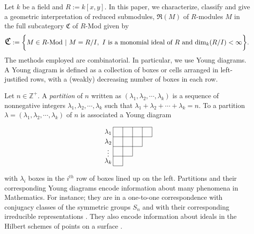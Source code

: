 \documentclass[12pt,a4paper]{article}
\newcommand{\noi}{\noindent}
\begin{document}
		\begin{paragraph}\noi
			Let $k$ be a field and $R:=k[x, y]$. In this paper, we characterize, classify and give a geometric interpretation of reduced submodules, $\mathfrak{R}(M)$ of $R$-modules $M$ in the full subcategory $\mathfrak{C}$ of $R$-Mod given by $$\text{\Large $\mathfrak{C}$}:=\bigg\{ M \in R\text{-Mod} ~|~ M=R/I,~ I~\text{is a monomial ideal of $R$ and} ~\text{dim}_k  (R/I)  < \infty\bigg\}.$$
			The methods employed are combinatorial. In particular, we use Young diagrams. A Young diagram is defined as a collection of boxes or cells arranged in left-justified rows, with a (weakly) decreasing number of boxes in each row. 
		\end{paragraph}
		\begin{paragraph}\noi
			Let $n\in \mathbb{Z}^+$. A {\it partition} of $n$ written as $(\lambda_1, \lambda_2, \cdots, \lambda_k)$ is a sequence of nonnegative integers $\lambda_1, \lambda_2,\cdots,\lambda_k$ such that $\lambda_1+ \lambda_2+\cdots+\lambda_k=n$. To a partition $\lambda=(\lambda_1, \lambda_2, \cdots, \lambda_k)$ of $n$ is associated a Young diagram
			
			$$	\begin{tikzpicture}[scale=0.5]
				\draw [-] (0, 0) -- (1, 0);
				\draw [-] (0, 0) -- (0, 4);
				\draw [-] (1, 0) -- (1, 4);
				\draw [-] (2, 1) -- (2, 4);
				\draw [-] (3, 2) -- (3, 4);
				\draw [-] (4, 3) -- (4, 4);
				\draw [-] (0, 1) -- (2, 1);
				\draw [-] (0, 2) -- (3, 2);
				\draw [-] (0, 3) -- (4, 3);
				\draw [-] (0, 4) -- (4, 4);
				
				\node (p) at (-0.5, 3.5) {$\lambda_1$};
				\node (p) at (-0.5, 2.5) {$\lambda_2$};
				\node (p) at (-0.5, 1.5) {$\vdots$};
				\node (p) at (-0.5, 0.5) {$\lambda_k$};
			\end{tikzpicture}$$
			
			with $\lambda_i$ boxes in the $i^{th}$ row of boxes lined up on the left. Partitions and their corresponding Young diagrams encode information about many phenomena in Mathematics. For instance; they are in a one-to-one correspondence with conjugacy classes of the symmetric groups $S_n$ and with their corresponding irreducible representations   \cite{fulton1997young, fulton1991}. They also encode information about ideals in the Hilbert schemes of points on a surface \cite{nakajima1999lectures}.
		\end{paragraph}
\end{document}
